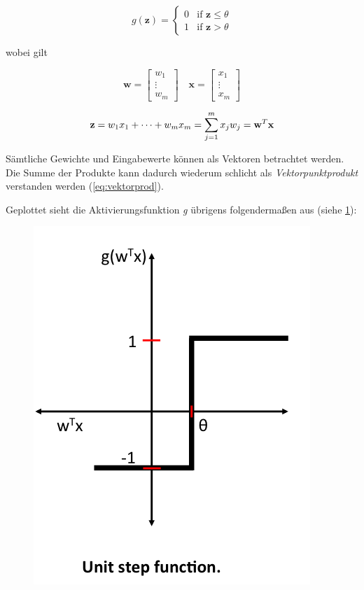 \begin{equation} \label{eq:aktFkt}
g(\mathbf{z}) =\begin{cases}
	0 & \mbox{if } \mathbf{z} \leq \theta \\
    1 & \mbox{if } \mathbf{z} > \theta
  \end{cases}
\end{equation}

wobei gilt

\begin{equation} \label{eq:vektorprod}
\mathbf{w} = \begin{bmatrix}
    w_{1}  \\
    \vdots \\
    w_{m}
\end{bmatrix}
\quad  \mathbf{x} = \begin{bmatrix}
    x_{1}  \\
    \vdots \\
    x_{m}
\end{bmatrix}
\end{equation}

\begin{equation}
\mathbf{z} =  w_1x_{1} + \dots + w_mx_{m} = \sum_{j=1}^{m} x_{j}w_{j} \\ = \mathbf{w}^T\mathbf{x}
\end{equation}

Sämtliche Gewichte und Eingabewerte können als Vektoren betrachtet werden. Die Summe der Produkte kann dadurch wiederum schlicht als \emph{Vektorpunktprodukt} verstanden werden (\ref{eq:vektorprod}).

Geplottet sieht die Aktivierungsfunktion \emph{g} übrigens folgendermaßen aus (siehe \ref{fig:perceptron_einhSprFkt}):

\begin{figure}[!htb]
	\centering
	\includegraphics[width=.3\linewidth]{./img/perceptron_einheitsSprungfunktion}
	\label{fig:perceptron_einhSprFkt}
\end{figure}

